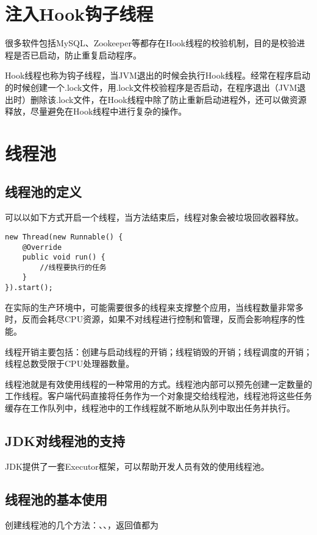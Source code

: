 \documentclass[a4paper]{report}
\begin{document}
\section{注入Hook钩子线程}
很多软件包括MySQL、Zookeeper等都存在Hook线程的校验机制，目的是校验进程是否已启动，防止重复启动程序。

Hook线程也称为钩子线程，当JVM退出的时候会执行Hook线程。经常在程序启动的时候创建一个.lock文件，用.lock文件校验程序是否启动，在程序退出（JVM退出时）删除该.lock文件，在Hook线程中除了防止重新启动进程外，还可以做资源释放，尽量避免在Hook线程中进行复杂的操作。
\section{线程池}
\subsection{线程池的定义}
可以以如下方式开启一个线程，当方法结束后，线程对象会被垃圾回收器释放。
\begin{Verbatim}[frame=single,numbersep=5pt,xleftmargin=1.5em,xrightmargin=1.5em]
new Thread(new Runnable() {
    @Override
    public void run() {
        //线程要执行的任务
    }
}).start();
\end{Verbatim}

在实际的生产环境中，可能需要很多的线程来支撑整个应用，当线程数量非常多时，反而会耗尽CPU资源，如果不对线程进行控制和管理，反而会影响程序的性能。

线程开销主要包括：创建与启动线程的开销；线程销毁的开销；线程调度的开销；线程总数受限于CPU处理器数量。

线程池就是有效使用线程的一种常用的方式。线程池内部可以预先创建一定数量的工作线程。客户端代码直接将任务作为一个对象提交给线程池，线程池将这些任务缓存在工作队列中，线程池中的工作线程就不断地从队列中取出任务并执行。
\subsection{JDK对线程池的支持}
JDK提供了一套Executor框架，可以帮助开发人员有效的使用线程池。

\subsection{线程池的基本使用}
创建线程池的几个方法：、、，返回值都为
\end{document}
